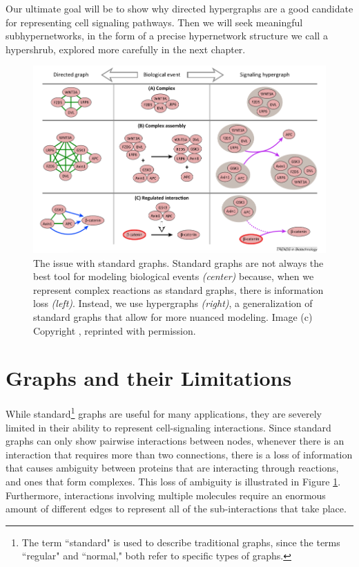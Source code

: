 \documentclass[12pt,twoside]{reedthesis}
\theoremstyle{definition}
\begin{document}
Our ultimate goal will be to show why directed hypergraphs are a good candidate for representing cell signaling pathways. Then we will seek meaningful subhypernetworks, in the form of a precise hypernetwork structure we call a hypershrub, explored more carefully in the next chapter.

\begin{figure}[h]
  \begin{center}
    \includegraphics[width=\textwidth]{anna_fig}
  \caption[The issue with standard graphs.]{The issue with standard graphs. Standard graphs are not always the best tool for modeling biological events \textit{(center)} because, when we represent complex reactions as standard graphs, there is information loss \textit{(left)}. Instead, we use hypergraphs \textit{(right)}, a generalization of standard graphs that allow for more nuanced modeling. Image (c) Copyright \cite{Ritz2014a}, reprinted with permission.}
  \label{fig:anna_fig}
  \end{center}
\end{figure}

\section{Graphs and their Limitations}

While standard\footnote{The term ``standard" is used to describe traditional graphs, since the terms ``regular" and ``normal," both refer to specific types of graphs.} graphs are useful for many applications, they are severely limited in their ability to represent cell-signaling interactions.  Since standard graphs can only show pairwise interactions between nodes, whenever there is an interaction that requires more than two connections, there is a loss of information that causes ambiguity between proteins that are interacting through reactions, and ones that form complexes. This loss of ambiguity is illustrated in Figure \ref{fig:anna_fig}. Furthermore, interactions involving multiple molecules require an enormous amount of different edges to represent all of the sub-interactions that take place.\par
\end{document}
